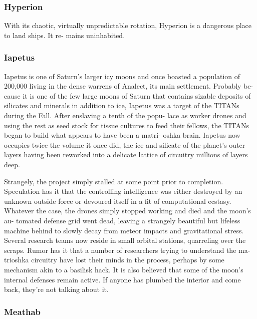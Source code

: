 \subsubsection{Hyperion}

With its chaotic, virtually unpredictable rotation, 
Hyperion is a dangerous place to land ships. It re-
mains uninhabited.

\subsubsection{Iapetus}

Iapetus is one of Saturn's larger icy moons and once 
boasted a population of 200,000 living in the dense 
warrens of Analect, its main settlement. Probably be-
cause it is one of the few large moons of Saturn that 
contains sizable deposits of silicates and minerals in 
addition to ice, Iapetus was a target of the TITANs 
during the Fall. After enslaving a tenth of the popu-
lace as worker drones and using the rest as seed stock 
for tissue cultures to feed their fellows, the TITANs 
began to build what appears to have been a matri-
oshka brain. Iapetus now occupies twice the volume 
it once did, the ice and silicate of the planet's outer 
layers having been reworked into a delicate lattice of 
circuitry millions of layers deep.

Strangely, the project simply stalled at some point 
prior to completion. Speculation has it that the 
controlling intelligence was either destroyed by an 
unknown outside force or devoured itself in a fit of 
computational ecstasy. Whatever the case, the drones 
simply stopped working and died and the moon's au-
tomated defense grid went dead, leaving a strangely 
beautiful but lifeless machine behind to slowly decay 
from meteor impacts and gravitational stress. Several 
research teams now reside in small orbital stations, 
quarreling over the scraps. Rumor has it that a 
number of researchers trying to understand the ma-
trioshka circuitry have lost their minds in the process, 
perhaps by some mechanism akin to a basilisk hack. 
It is also believed that some of the moon's internal 
defenses remain active. If anyone has plumbed the 
interior and come back, they're not talking about it.

\subsubsection{Meathab}

